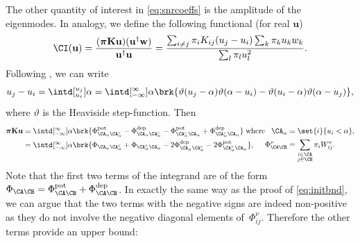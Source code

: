 \documentclass[12pt]{article}
\newcommand{\eqm}{\pi}
\newcommand{\eq}{\boldsymbol{\eqm}}
\newcommand{\wm}{w}
\newcommand{\w}{\mathbf{\wm}}
\newcommand{\Wm}{W}
\newcommand{\encm}{K}
\newcommand{\enc}{\mathbf{\encm}}
\newcommand{\Fm}{\Phi}
\newcommand{\pot}{^{\text{pot}}}
\newcommand{\dep}{^{\text{dep}}}
\begin{document}
The other quantity of interest in \cref{eq:snrcoeffs} is the amplitude of the eigenmodes.
In analogy, we define the following functional (for real \(\mathbf{u}\))
%
\begin{equation*}
  \CI(\mathbf{u}) = \frac{(\eq \enc \mathbf{u}) (\mathbf{u}^\dag \w)}{\mathbf{u}^\dag \mathbf{u}}
      = \frac{\sum_{i \neq j} \eqm_i \encm_{ij} (u_j - u_i) \sum_k \eqm_k u_k \wm_k} 
             {\sum_{l} \eqm_l u_l^2} .
\end{equation*}
%
Following \cite{Lawler1988cheeger}, we can write
%
\begin{equation*}
  u_j - u_i = \intd[_{u_i}^{u_j}]{\alpha} 
      = \intd[_{-\infty}^{\infty}]{\alpha} 
        \brk{\vartheta(u_j - \alpha) \vartheta(\alpha - u_i) 
           - \vartheta(u_i - \alpha) \vartheta(\alpha - u_j)} ,
\end{equation*}
%
where \(\vartheta\) is the Heaviside step-function.
Then 
%
\begin{equation*}
  \begin{aligned}[t]
  \eq \enc \mathbf{u} &= \intd[_{-\infty}^{\infty}]{\alpha}  \brk{
        \Fm\pot_{\CA_\alpha \CA_\alpha^c} - \Fm\dep_{\CA_\alpha \CA_\alpha^c} 
      - \Fm\pot_{\CA_\alpha^c \CA_\alpha} + \Fm\dep_{\CA_\alpha^c \CA_\alpha} }
  \; \text{where} 
    \\
    &= \intd[_{-\infty}^{\infty}]{\alpha}  \brk{
        \Fm_{\CA_\alpha \CA_\alpha^c} + \Fm_{\CA_\alpha^c \CA_\alpha} 
        - 2\Fm\dep_{\CA_\alpha \CA_\alpha^c} - 2\Fm\pot_{\CA_\alpha^c \CA_\alpha} } ,
  \end{aligned}
  \begin{aligned}[t]
    \CA_\alpha &= \set{i}{u_i < \alpha} , 
    \\
    \Fm^\nu_{\CA \CB} &= \sum_{\substack{i \in \CA \\ j \in \CB}} 
                        \eqm_i \Wm^\nu_{ij} .
  \end{aligned}
\end{equation*}
%
Note that the first two terms of the integrand are of the form \( \Fm_{\CA \CB} = \Fm_{\CA \CB}\pot + \Fm_{\CA \CB}\dep \).
In exactly the same way as the proof of \cref{eq:initbnd}, we can argue that the two terms with the negative signs are indeed non-positive as they do not involve the negative diagonal elements of~\( \Fm_{ij}^\nu \).
Therefore the other terms provide an upper bound:
%
\end{document}
